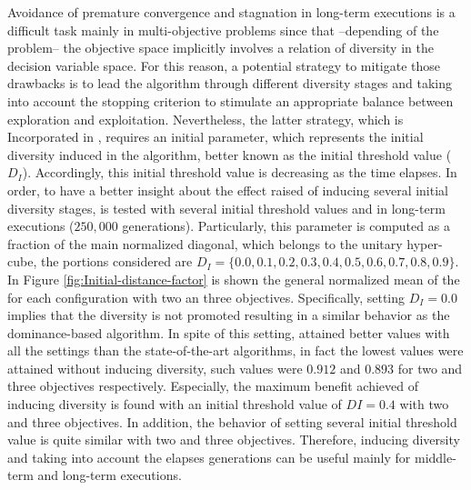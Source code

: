 Avoidance of premature convergence and stagnation in long-term executions is a difficult task mainly in multi-objective problems since that --depending of the problem-- the objective space implicitly involves a relation of diversity in the decision variable space.
%
For this reason, a potential strategy to mitigate those drawbacks is to lead the algorithm through different diversity stages and taking into account the stopping criterion to stimulate an appropriate balance between exploration and exploitation.
%
Nevertheless, the latter strategy, which is Incorporated in \VSDMOEA{}, requires an initial parameter, which represents the initial diversity induced in the algorithm, better known as the initial threshold value ($D_I$).
%
Accordingly, this initial threshold value is decreasing as the time elapses.
%
In order, to have a better insight about the effect raised of inducing several initial diversity stages, \VSDMOEA{} is tested with several initial threshold values and in long-term executions ($250,000$ generations).
%
Particularly, this parameter is computed as a fraction of the main normalized diagonal, which belongs to the unitary hyper-cube, the portions considered are $D_I = \{0.0, 0.1, 0.2, 0.3, 0.4, 0.5, 0.6, 0.7, 0.8, 0.9\}$.
%
In Figure \ref{fig:Initial-distance-factor} is shown the general normalized mean of the \HV{} for each configuration with two an three objectives.
%
Specifically, setting $D_I=0.0$ implies that the diversity is not promoted resulting in a similar behavior as the dominance-based algorithm.
%
In spite of this setting, \VSDMOEA{} attained better \HV{} values with all the settings than the state-of-the-art algorithms, in fact the lowest values were attained without inducing diversity, such values were $0.912$ and $0.893$ for two and three objectives respectively.
%
Especially, the maximum benefit achieved of inducing diversity is found with an initial threshold value of $DI=0.4$ with two and three objectives.
%
In addition, the behavior of setting several initial threshold value is quite similar with two and three objectives.
%
Therefore, inducing diversity and taking into account the elapses generations can be useful mainly for middle-term and long-term executions.

